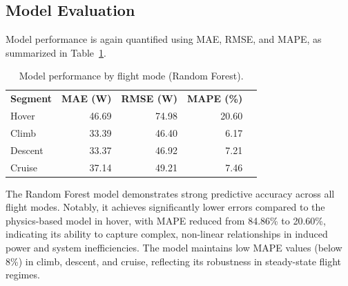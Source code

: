 \subsection{Model Evaluation}

Model performance is again quantified using MAE, RMSE, and MAPE, as summarized in Table~\ref{tab:performance_no_transition}.

\begin{table}[hp]
\centering
\caption{Model performance by flight mode (Random Forest).}
\label{tab:performance_no_transition}
\begin{tabular}{lrrrr}
\textbf{Segment} & \textbf{MAE (W)} & \textbf{RMSE (W)} & \textbf{MAPE (\%)} \\
Hover      & 46.69 & 74.98 & 20.60 \\
Climb      & 33.39 & 46.40 & 6.17 \\
Descent    & 33.37 & 46.92 & 7.21 \\
Cruise     & 37.14 & 49.21 & 7.46 \\
\end{tabular}
\end{table}

The Random Forest model demonstrates strong predictive accuracy across all flight modes. Notably, it achieves significantly lower errors compared to the physics-based model in hover, with MAPE reduced from 84.86\% to 20.60\%, indicating its ability to capture complex, non-linear relationships in induced power and system inefficiencies. The model maintains low MAPE values (below 8\%) in climb, descent, and cruise, reflecting its robustness in steady-state flight regimes. 
